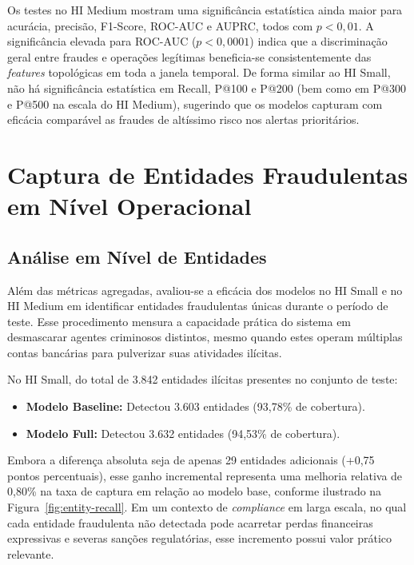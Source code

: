 \documentclass[a4paper,12pt,oneside,onecolumn,final,fleqn]{repUERJ}
\begin{document}
Os testes no HI Medium mostram uma significância estatística ainda maior para acurácia, precisão, F1-Score, ROC-AUC e AUPRC, todos com $p < 0{,}01$. A significância elevada para ROC-AUC ($p < 0{,}0001$) indica que a discriminação geral entre fraudes e operações legítimas beneficia-se consistentemente das \textit{features} topológicas em toda a janela temporal. De forma similar ao HI Small, não há significância estatística em Recall, P@100 e P@200 (bem como em P@300 e P@500 na escala do HI Medium), sugerindo que os modelos capturam com eficácia comparável as fraudes de altíssimo risco nos alertas prioritários.

\section{Captura de Entidades Fraudulentas em Nível Operacional}

\subsection{Análise em Nível de Entidades}

Além das métricas agregadas, avaliou-se a eficácia dos modelos no HI Small e no HI Medium em identificar entidades fraudulentas únicas durante o período de teste. Esse procedimento mensura a capacidade prática do sistema em desmascarar agentes criminosos distintos, mesmo quando estes operam múltiplas contas bancárias para pulverizar suas atividades ilícitas. 

No HI Small, do total de 3.842 entidades ilícitas presentes no conjunto de teste:

\begin{itemize}
    \item \textbf{Modelo Baseline:} Detectou 3.603 entidades (93,78\% de cobertura).
    \item \textbf{Modelo Full:} Detectou 3.632 entidades (94,53\% de cobertura).
\end{itemize}

Embora a diferença absoluta seja de apenas 29 entidades adicionais (+0,75 pontos percentuais), esse ganho incremental representa uma melhoria relativa de 0,80\% na taxa de captura em relação ao modelo base, conforme ilustrado na Figura~\ref{fig:entity-recall}. Em um contexto de \textit{compliance} em larga escala, no qual cada entidade fraudulenta não detectada pode acarretar perdas financeiras expressivas e severas sanções regulatórias, esse incremento possui valor prático relevante.
\end{document}
